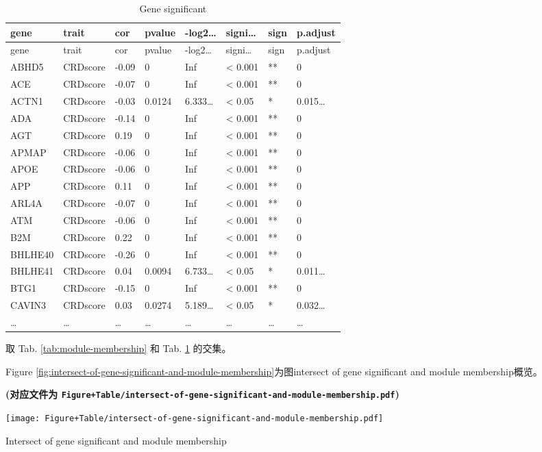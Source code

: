 \documentclass[
]{article}
\begin{document}
\begin{longtable}[]{@{}llllllll@{}}
\caption{\label{tab:gene-significant}Gene significant}\tabularnewline
\toprule
gene & trait & cor & pvalue & -log2\ldots{} & signi\ldots{} & sign & p.adjust\tabularnewline
\midrule
\endfirsthead
\toprule
gene & trait & cor & pvalue & -log2\ldots{} & signi\ldots{} & sign & p.adjust\tabularnewline
\midrule
\endhead
ABHD5 & CRDscore & -0.09 & 0 & Inf & \textless{} 0.001 & ** & 0\tabularnewline
ACE & CRDscore & -0.07 & 0 & Inf & \textless{} 0.001 & ** & 0\tabularnewline
ACTN1 & CRDscore & -0.03 & 0.0124 & 6.333\ldots{} & \textless{} 0.05 & * & 0.015\ldots{}\tabularnewline
ADA & CRDscore & -0.14 & 0 & Inf & \textless{} 0.001 & ** & 0\tabularnewline
AGT & CRDscore & 0.19 & 0 & Inf & \textless{} 0.001 & ** & 0\tabularnewline
APMAP & CRDscore & -0.06 & 0 & Inf & \textless{} 0.001 & ** & 0\tabularnewline
APOE & CRDscore & -0.06 & 0 & Inf & \textless{} 0.001 & ** & 0\tabularnewline
APP & CRDscore & 0.11 & 0 & Inf & \textless{} 0.001 & ** & 0\tabularnewline
ARL4A & CRDscore & -0.07 & 0 & Inf & \textless{} 0.001 & ** & 0\tabularnewline
ATM & CRDscore & -0.06 & 0 & Inf & \textless{} 0.001 & ** & 0\tabularnewline
B2M & CRDscore & 0.22 & 0 & Inf & \textless{} 0.001 & ** & 0\tabularnewline
BHLHE40 & CRDscore & -0.26 & 0 & Inf & \textless{} 0.001 & ** & 0\tabularnewline
BHLHE41 & CRDscore & 0.04 & 0.0094 & 6.733\ldots{} & \textless{} 0.05 & * & 0.011\ldots{}\tabularnewline
BTG1 & CRDscore & -0.15 & 0 & Inf & \textless{} 0.001 & ** & 0\tabularnewline
CAVIN3 & CRDscore & 0.03 & 0.0274 & 5.189\ldots{} & \textless{} 0.05 & * & 0.032\ldots{}\tabularnewline
\ldots{} & \ldots{} & \ldots{} & \ldots{} & \ldots{} & \ldots{} & \ldots{} & \ldots{}\tabularnewline
\bottomrule
\end{longtable}

取 Tab. \ref{tab:module-membership} 和 Tab. \ref{tab:gene-significant} 的交集。

Figure \ref{fig:intersect-of-gene-significant-and-module-membership}为图intersect of gene significant and module membership概览。

\textbf{(对应文件为 \texttt{Figure+Table/intersect-of-gene-significant-and-module-membership.pdf})}

\def\@captype{figure}
\begin{center}
\texttt{[image: Figure+Table/intersect-of-gene-significant-and-module-membership.pdf]}
\caption{Intersect of gene significant and module membership}\label{fig:intersect-of-gene-significant-and-module-membership}
\end{center}
\end{document}
